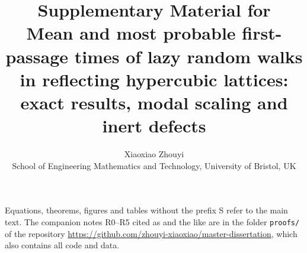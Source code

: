 \documentclass[11pt,a4paper]{article}
\title{Supplementary Material for\\[4pt]
\large Mean and most probable first-passage times of lazy random walks in reflecting hypercubic lattices:
exact results, modal scaling and inert defects}
\author{Xiaoxiao Zhouyi\\[2pt]
{\normalsize School of Engineering Mathematics and Technology, University of Bristol, UK}}
\date{}
\numberwithin{equation}{section}
\begin{document}
\maketitle

\noindent Equations, theorems, figures and tables without the prefix S refer to the main text. The companion notes
R0--R5 cited as  and the like are in the folder \texttt{proofs/} of the repository
\url{https://github.com/zhouyi-xiaoxiao/master-dissertation}, which also contains all code and data.

{\small\setcounter{tocdepth}{1}\tableofcontents}














\end{document}
